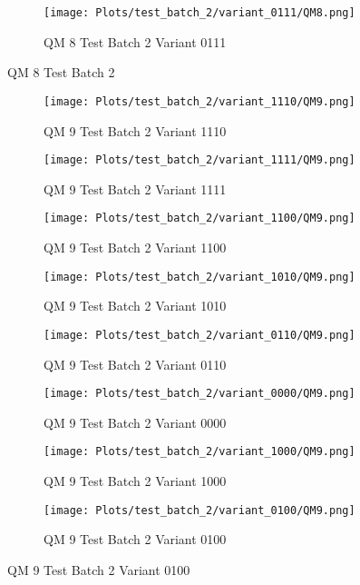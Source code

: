 \documentclass{DissertateFigs}
\begin{document}
\begin{figure}[t!]
\medskip

    \begin{subfigure}{0.38\textwidth}
    \texttt{[image: Plots/test\_batch\_2/variant\_0111/QM8.png]}
    \caption{QM 8 Test Batch 2 Variant 0111}
    \end{subfigure}
\caption{QM 8 Test Batch 2}
    \end{figure}
\clearpage
\begin{figure}[t!]
    \begin{subfigure}{0.47\textwidth}
    \texttt{[image: Plots/test\_batch\_2/variant\_1110/QM9.png]}
    \caption{QM 9 Test Batch 2 Variant 1110}
    \end{subfigure}
    \begin{subfigure}{0.47\textwidth}
    \texttt{[image: Plots/test\_batch\_2/variant\_1111/QM9.png]}
    \caption{QM 9 Test Batch 2 Variant 1111}
    \end{subfigure}

\medskip

    \begin{subfigure}{0.47\textwidth}
    \texttt{[image: Plots/test\_batch\_2/variant\_1100/QM9.png]}
    \caption{QM 9 Test Batch 2 Variant 1100}
    \end{subfigure}
    \begin{subfigure}{0.47\textwidth}
    \texttt{[image: Plots/test\_batch\_2/variant\_1010/QM9.png]}
    \caption{QM 9 Test Batch 2 Variant 1010}
    \end{subfigure}

\medskip

    \begin{subfigure}{0.47\textwidth}
    \texttt{[image: Plots/test\_batch\_2/variant\_0110/QM9.png]}
    \caption{QM 9 Test Batch 2 Variant 0110}
    \end{subfigure}
    \begin{subfigure}{0.47\textwidth}
    \texttt{[image: Plots/test\_batch\_2/variant\_0000/QM9.png]}
    \caption{QM 9 Test Batch 2 Variant 0000}
    \end{subfigure}

\medskip

    \begin{subfigure}{0.47\textwidth}
    \texttt{[image: Plots/test\_batch\_2/variant\_1000/QM9.png]}
    \caption{QM 9 Test Batch 2 Variant 1000}
    \end{subfigure}
    \begin{subfigure}{0.47\textwidth}
    \texttt{[image: Plots/test\_batch\_2/variant\_0100/QM9.png]}
    \caption{QM 9 Test Batch 2 Variant 0100}
    \end{subfigure}


\end{figure}
\end{document}
